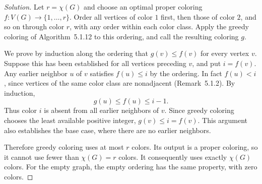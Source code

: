 \documentclass[12pt]{amsart}
\newenvironment{solution}{\begin{proof}[Solution]}{\end{proof}}
\begin{document}
    \begin{solution}
        Let $r=\chi(G)$ and choose an optimal proper coloring
        $f:V(G)\to\{1,\ldots,r\}$.  Order all vertices of color $1$ first,
        then those of color $2$, and so on through color $r$, with any order
        within each color class.  Apply the greedy coloring of
        Algorithm~5.1.12 to this ordering, and call the resulting coloring $g$.

        We prove by induction along the ordering that $g(v)\leq f(v)$ for
        every vertex $v$.  Suppose this has been established for all vertices
        preceding $v$, and put $i=f(v)$.  Any earlier neighbor $u$ of $v$
        satisfies $f(u)\leq i$ by the ordering.  In fact $f(u)<i$, since
        vertices of the same color class are nonadjacent
        (Remark~5.1.2).  By induction,
        \[
            g(u)\leq f(u)\leq i-1.
        \]
        Thus color $i$ is absent from all earlier neighbors of $v$.  Since
        greedy coloring chooses the least available positive integer,
        $g(v)\leq i=f(v)$.  This argument also establishes the base case,
        where there are no earlier neighbors.

        Therefore greedy coloring uses at most $r$ colors.  Its output is a
        proper coloring, so it cannot use fewer than $\chi(G)=r$ colors.
        It consequently uses exactly $\chi(G)$ colors.  For the empty graph,
        the empty ordering has the same property, with zero colors.
    \end{solution}
\end{document}

